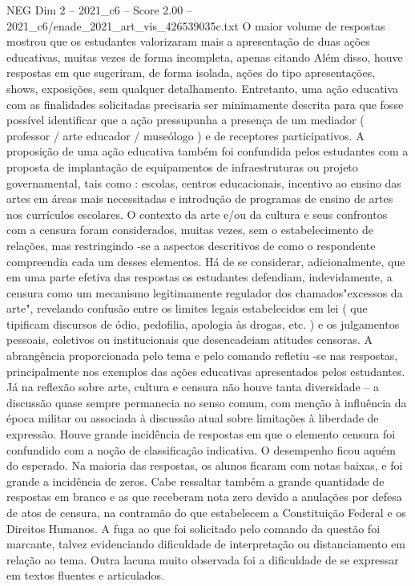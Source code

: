 \begin{textsample}{NEG Dim 2 – 2021\_c6 – Score 2.00 – 2021\_c6/enade\_2021\_art\_vis\_426539035c.txt}
O maior volume de respostas mostrou que os estudantes valorizaram mais a apresentação de duas ações educativas, muitas vezes de forma incompleta, apenas citando Além disso, houve respostas em que sugeriram, de forma isolada, ações do tipo apresentações, shows, exposições, sem qualquer detalhamento.
Entretanto, uma ação educativa com as finalidades solicitadas precisaria ser minimamente descrita para que fosse possível identificar que a ação pressupunha a presença de um mediador ( professor / arte educador / museólogo ) e de receptores participativos.
A proposição de uma ação educativa também foi confundida pelos estudantes com a proposta de implantação de equipamentos de infraestruturas ou projeto governamental, tais como : escolas, centros educacionais, incentivo ao ensino das artes em áreas mais necessitadas e introdução de programas de ensino de artes nos currículos escolares.
O contexto da arte e/ou da cultura e seus confrontos com a censura foram considerados, muitas vezes, sem o estabelecimento de relações, mas restringindo -se a aspectos descritivos de como o respondente compreendia cada um desses elementos.
Há de se considerar, adicionalmente, que em uma parte efetiva das respostas os estudantes defendiam, indevidamente, a censura como um mecanismo legitimamente regulador dos chamados"excessos da arte", revelando confusão entre os limites legais estabelecidos em lei ( que tipificam discursos de ódio, pedofilia, apologia às drogas, etc. ) e os julgamentos pessoais, coletivos ou institucionais que desencadeiam atitudes censoras.
A abrangência proporcionada pelo tema e pelo comando refletiu -se nas respostas, principalmente nos exemplos das ações educativas apresentados pelos estudantes.
Já na reflexão sobre arte, cultura e censura não houve tanta diversidade – a discussão quase sempre permanecia no senso comum, com menção à influência da época militar ou associada à discussão atual sobre limitações à liberdade de expressão.
Houve grande incidência de respostas em que o elemento censura foi confundido com a noção de classificação indicativa.
O desempenho ficou aquém do esperado.
Na maioria das respostas, os alunos ficaram com notas baixas, e foi grande a incidência de zeros.
Cabe ressaltar também a grande quantidade de respostas em branco e as que receberam nota zero devido a anulações por defesa de atos de censura, na contramão do que estabelecem a Constituição Federal e os Direitos Humanos.
A fuga ao que foi solicitado pelo comando da questão foi marcante, talvez evidenciando dificuldade de interpretação ou distanciamento em relação ao tema.
Outra lacuna muito observada foi a dificuldade de se expressar em textos fluentes e articulados.

\end{textsample}

